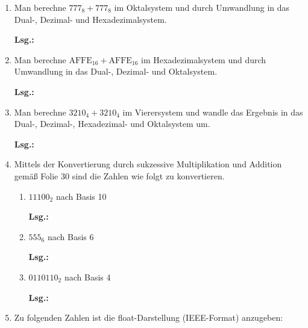 \documentclass[12pt,a4paper]{scrreprt}
\newcommand{\Lsg}{\par \textbf{Lsg.: }}
\begin{document}
\begin{enumerate}
\begin{enumerate}
\Lsg%

\item $43_{10} - 11_{10}$,

\Lsg%

\item $17_{10} - 109_{10}$

\Lsg%

\end{enumerate}

\item Man berechne $777_8 + 777_8$ im Oktalsystem und durch Umwandlung in das Dual-, Dezimal- und Hexadezimalsystem.

\Lsg%

\item Man berechne $\text{AFFE}_{16} + \text{AFFE}_{16}$ im Hexadezimalsystem und durch Umwandlung in das Dual-, Dezimal- und Oktalsystem.

\Lsg%

\item Man berechne $3210_4 + 3210_4$ im Vierersystem und wandle das Ergebnis in das Dual-, Dezimal-, Hexadezimal- und Oktalsystem um.

\Lsg%

\item Mittels der Konvertierung durch sukzessive Multiplikation und Addition gemäß Folie 30 sind die Zahlen wie folgt zu konvertieren.

\begin{enumerate}
\item $11100_2$ nach Basis 10

\Lsg%

\item $555_6$ nach Basis 6

\Lsg%

\item $0110110_2$ nach Basis 4

\Lsg%

\end{enumerate}


\item Zu folgenden Zahlen ist die float-Darstellung (IEEE-Format) anzugeben:


\end{enumerate}
\end{document}
